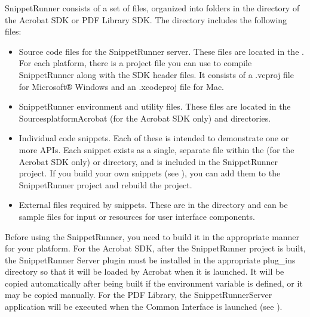 \documentclass[letterpaper,12pt,english,openany,oneside]{sphinxmanual}
\begin{document}
SnippetRunner consists of a set of files, organized into folders in the  directory of the Acrobat SDK or PDF Library SDK. The directory includes the following files:
\begin{itemize}
\item {} 
Source code files for the SnippetRunner server. These files are located in the . For each platform, there is a project file you can use to compile SnippetRunner along with the SDK header files. It consists of a .vcproj file for Microsoft® Windows and an .xcodeproj file for Mac.

\item {} 
SnippetRunner environment and utility files. These files are located in the SourcesplatformAcrobat (for the Acrobat SDK only) and  directories.

\item {} 
Individual code snippets. Each of these is intended to demonstrate one or more APIs. Each snippet exists as a single, separate file within the  (for the Acrobat SDK only) or  directory, and is included in the SnippetRunner project. If you build your own snippets (see ), you can add them to the SnippetRunner project and rebuild the project.

\item {} 
External files required by snippets. These are in the  directory and can be sample files for input or resources for user interface components.

\end{itemize}

Before using the SnippetRunner, you need to build it in the appropriate manner for your platform. For the Acrobat SDK, after the SnippetRunner project is built, the SnippetRunner Server plug\sphinxhyphen{}in must be installed in the appropriate plug\_ins directory so that it will be loaded by Acrobat when it is launched. It will be copied automatically after being built if the  environment variable is defined, or it may be copied manually. For the PDF Library, the SnippetRunnerServer application will be executed when the Common Interface is launched (see ).
\end{document}
